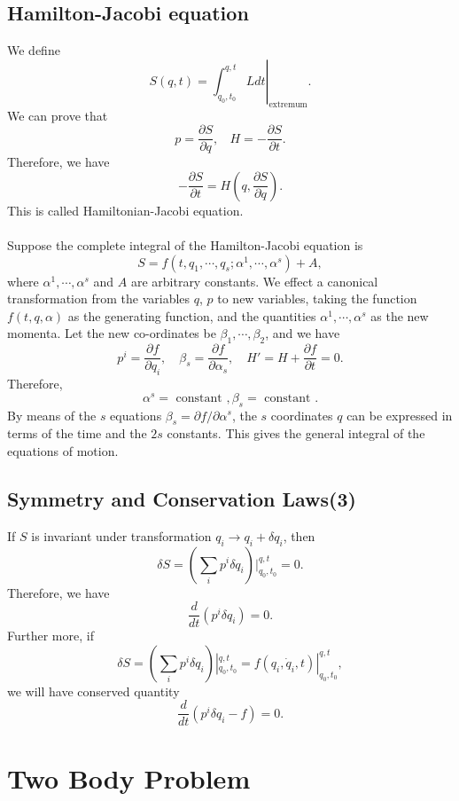\section{Hamilton-Jacobi equation}
We define
\[S(q,t)=\left. \int_{q_0,t_0}^{q,t} L dt\right|_{\mathrm{extremum}}.\]
We can prove that
\[p = \frac{\partial S}{\partial q}, \ \ \ \ H = -\frac{\partial S}{\partial t}.\]
Therefore, we have
\[-\frac{\partial S}{\partial t} = H (q,\frac{\partial S}{\partial q}).\]
This is called Hamiltonian-Jacobi equation.\\ \\
Suppose the complete integral of the Hamilton-Jacobi equation is
\[S=f(t,q_1,\cdots,q_s;\alpha^1,\cdots,\alpha^s)+A,\]
where $\alpha^1,\cdots,\alpha^s$ and $A$ are arbitrary constants. 
We effect a canonical transformation from the variables $q$, $p$ to new variables, taking the function $f(t,q,\alpha)$ as the generating function, and the quantities $\alpha^1,\cdots,\alpha^s$ as the new momenta.
Let the new co-ordinates be $\beta_1,\cdots,\beta_2$, and we have
\[p^i = \frac{\partial f}{\partial q_i} ,\quad \beta_s = \frac{\partial f}{\partial \alpha_s} ,\quad H' = H + \frac{\partial f}{\partial t} =0.\]
Therefore,
\[\alpha^s = \mbox{ constant }, \beta_s = \mbox{ constant }.\]
By means of the $s$ equations $\beta_s = \partial f / \partial \alpha^s$, the $s$ coordinates $q$ can be expressed in terms of the time and the $2s$ constants. This gives the general integral of the equations of motion.

\section{Symmetry and Conservation Laws(3)}
If $S$ is invariant under transformation $q_i \rightarrow q_i + \delta q_i$, then 
\[\delta S = (\sum_i p^i \delta q_i) |_{q_0,t_0}^{q,t} = 0.\]
Therefore, we have
\[\frac{d}{dt} (p^i \delta q_i) = 0.\]
Further more, if
\[\delta S = (\sum_i p^i \delta q_i) |_{q_0,t_0}^{q,t} =  f(q_i,\dot{q}_i,t)|_{q_0,t_0}^{q,t}, \]
we will have conserved quantity
\[\frac{d}{dt} (p^i \delta q_i -f) = 0.\]

\chapter{Two Body Problem}
